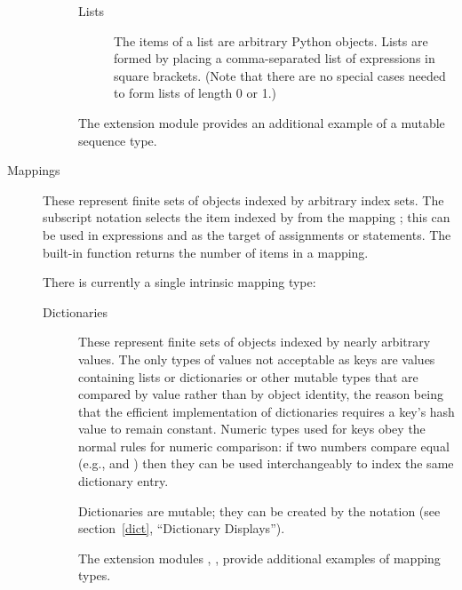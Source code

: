 \begin{description}
\begin{description}
\begin{description}

\item[Lists]
The items of a list are arbitrary Python objects.  Lists are formed
by placing a comma-separated list of expressions in square brackets.
(Note that there are no special cases needed to form lists of length 0
or 1.)

\end{description} %

The extension module  provides an
additional example of a mutable sequence type.


\end{description} %

\item[Mappings]
These represent finite sets of objects indexed by arbitrary index sets.
The subscript notation  selects the item indexed
by  from the mapping ; this can be used in
expressions and as the target of assignments or  statements.
The built-in function  returns the number of items
in a mapping.

There is currently a single intrinsic mapping type:

\begin{description}

\item[Dictionaries]
These represent finite sets of objects indexed by
nearly arbitrary values.  The only types of values not acceptable as
keys are values containing lists or dictionaries or other mutable
types that are compared by value rather than by object identity, the
reason being that the efficient implementation of dictionaries
requires a key's hash value to remain constant.
Numeric types used for keys obey the normal rules for numeric
comparison: if two numbers compare equal (e.g.,  and
) then they can be used interchangeably to index the same
dictionary entry.

Dictionaries are mutable; they can be created by the
 notation (see section~\ref{dict}, ``Dictionary
Displays'').

The extension modules ,
, 
provide additional examples of mapping types.

\end{description} %


\end{description}
